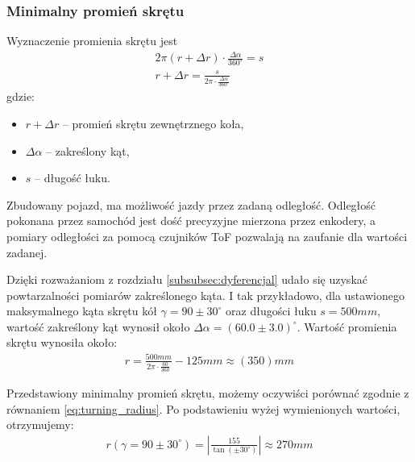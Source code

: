         \subsubsection{Minimalny promień skrętu}
        \label{subsubsec:minamalny_promien}
            Wyznaczenie promienia skrętu jest
            \begin{gather}
                2\pi (r + \Delta r) \cdot \frac{\Delta \alpha}{360^\circ} = s\\
                r + \Delta r = \frac{s}{2\pi \cdot \frac{\Delta \alpha}{360^\circ}}
            \end{gather}
            gdzie:
            \begin{itemize}
                \item $r + \Delta r$ -- promień skrętu zewnętrznego koła,
                \item $\Delta \alpha$ -- zakreślony kąt,
                \item $s$ -- długość łuku.
            \end{itemize}

            Zbudowany pojazd, ma możliwość jazdy przez zadaną odległość.
            Odległość pokonana przez samochód jest dość precyzyjne mierzona przez enkodery,
            a pomiary odległości za pomocą czujników ToF pozwalają na zaufanie dla wartości zadanej.

            Dzięki rozważaniom z rozdziału \ref{subsubsec:dyferencjal} udało się uzyskać powtarzalności pomiarów zakreślonego kąta.
            I tak przykładowo, dla ustawionego maksymalnego kąta skrętu kół $\gamma = 90 \pm 30^\circ$ oraz długości łuku $s = 500mm$, wartość zakreślony kąt wynosił około $\Delta \alpha = \left(60.0 \pm 3.0\right)^\circ$.
            Wartość promienia skrętu wynosiła około:
            \begin{gather}
                r = \frac{500mm}{2\pi \cdot \frac{60}{360}} - 125mm \approx (350)mm
            \end{gather}

            Przedstawiony minimalny promień skrętu, możemy oczywiści porównać zgodnie z równaniem \eqref{eq:turning_radius}.
            Po podstawieniu wyżej wymienionych wartości, otrzymujemy:
            \begin{gather}
                r(\gamma = 90 \pm 30^\circ) = \left|\frac{155}{\tan(\pm 30^\circ)}\right| \approx 270mm
            \end{gather}

